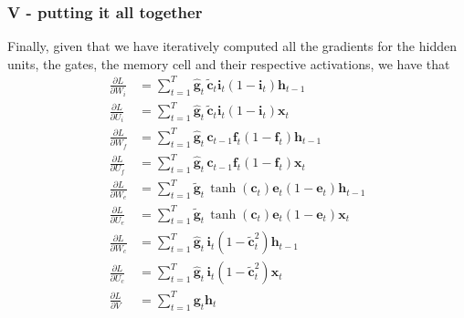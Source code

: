 \documentclass{article}
\begin{document}

\subsubsection*{V - putting it all together}
	Finally, given that we have iteratively computed all the gradients for the hidden units, the gates, the memory cell and their respective activations, we have that
	\begin{align}
		 \frac{\partial L}{\partial W_i} &= \sum_{t=1}^T \hat{\bm{g}}_t\,\tilde{\bm{c}}_t \bm{i}_t (1 - \bm{i}_t) \bm{h}_{t-1} \\
		 \frac{\partial L}{\partial U_i} &= \sum_{t=1}^T \hat{\bm{g}}_t\,\tilde{\bm{c}}_t \bm{i}_t (1 - \bm{i}_t) \bm{x}_{t} \\
		\frac{\partial L}{\partial W_f} &= \sum_{t=1}^T \hat{\bm{g}}_t\,\bm{c}_{t-1} \bm{f}_t (1 - \bm{f}_t) \bm{h}_{t-1} \\ 
		\frac{\partial L}{\partial U_f} &= \sum_{t=1}^T \hat{\bm{g}}_t\,\bm{c}_{t-1} \bm{f}_t (1 - \bm{f}_t) \bm{x}_{t} \\ 
		\frac{\partial L}{\partial W_e} &= \sum_{t=1}^T \tilde{\bm{g}}_t\,  \tanh(\bm{c}_t)\bm{e}_t(1 - \bm{e}_t)\bm{h}_{t-1} \\
		\frac{\partial L}{\partial U_e} &= \sum_{t=1}^T \tilde{\bm{g}}_t\,  \tanh(\bm{c}_t)\bm{e}_t(1 - \bm{e}_t) \bm{x}_{t} \\
		\frac{\partial L}{\partial W_c} &= \sum_{t=1}^T \hat{\bm{g}}_t\, \bm{i}_t (1 - \tilde{\bm{c}}_t^2) \bm{h}_{t-1} \\
		\frac{\partial L}{\partial U_c} &= \sum_{t=1}^T \hat{\bm{g}}_t\, \bm{i}_t (1 - \tilde{\bm{c}}_t^2) \bm{x}_{t} \\
		\frac{\partial L}{\partial V} &= \sum_{t=1}^T \bm{g}_t\bm{h}_t
	\end{align}
\end{document}
